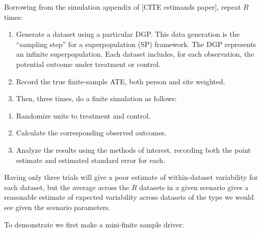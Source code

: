\documentclass[
]{book}
\providecommand{\tightlist}{%
  \setlength{\itemsep}{0pt}\setlength{\parskip}{0pt}}
\begin{document}
Borrowing from the simulation appendix of {[}CITE estimands paper{]}, repeat \(R\) times:

\begin{enumerate}
\def\labelenumi{\arabic{enumi}.}
\item
  Generate a dataset using a particular DGP. This data generation is the ``sampling step'' for a superpopulation (SP) framework. The DGP represents an inﬁnite superpopulation. Each dataset includes, for each observation, the potential outcome under treatment or control.
\item
  Record the true finite-sample ATE, both person and site weighted.
\item
  Then, three times, do a finite simulation as follows:
\end{enumerate}

\begin{enumerate}
\def\labelenumi{\alph{enumi}.}
\tightlist
\item
  Randomize units to treatment and control.
\item
  Calculate the corresponding observed outcomes.
\item
  Analyze the results using the methods of interest, recording both the point estimate and estimated standard error for each.
\end{enumerate}

Having only three trials will give a poor estimate of within-dataset variability for each dataset, but the average across the
\(R\) datasets in a given scenario gives a reasonable estimate of expected variability across datasets of the type we would see given the scenario parameters.

To demonstrate we first make a mini-finite sample driver:
\end{document}
